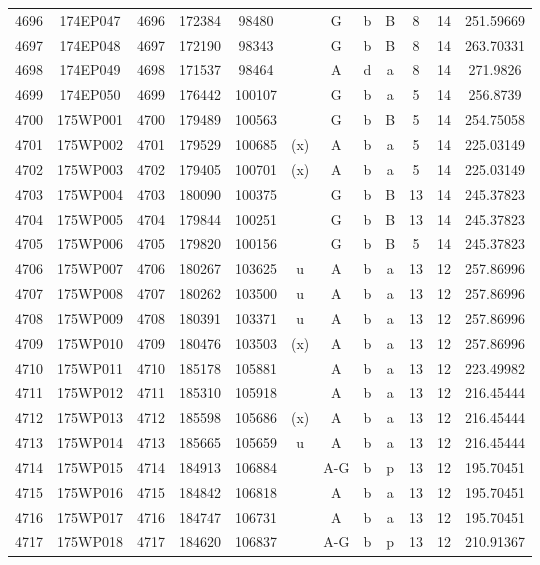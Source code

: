 \begin{tabular}{|*{12}{c|}}
4696 & 174EP047 & 4696 & 172384 & 98480 &  & G & b & B & 8 & 14 & 251.59669 \\ 
4697 & 174EP048 & 4697 & 172190 & 98343 &  & G & b & B & 8 & 14 & 263.70331 \\ 
4698 & 174EP049 & 4698 & 171537 & 98464 &  & A & d & a & 8 & 14 & 271.9826 \\ 
4699 & 174EP050 & 4699 & 176442 & 100107 &  & G & b & a & 5 & 14 & 256.8739 \\ 
4700 & 175WP001 & 4700 & 179489 & 100563 &  & G & b & B & 5 & 14 & 254.75058 \\ 
4701 & 175WP002 & 4701 & 179529 & 100685 & (x) & A & b & a & 5 & 14 & 225.03149 \\ 
4702 & 175WP003 & 4702 & 179405 & 100701 & (x) & A & b & a & 5 & 14 & 225.03149 \\ 
4703 & 175WP004 & 4703 & 180090 & 100375 &  & G & b & B & 13 & 14 & 245.37823 \\ 
4704 & 175WP005 & 4704 & 179844 & 100251 &  & G & b & B & 13 & 14 & 245.37823 \\ 
4705 & 175WP006 & 4705 & 179820 & 100156 &  & G & b & B & 5 & 14 & 245.37823 \\ 
4706 & 175WP007 & 4706 & 180267 & 103625 & u & A & b & a & 13 & 12 & 257.86996 \\ 
4707 & 175WP008 & 4707 & 180262 & 103500 & u & A & b & a & 13 & 12 & 257.86996 \\ 
4708 & 175WP009 & 4708 & 180391 & 103371 & u & A & b & a & 13 & 12 & 257.86996 \\ 
4709 & 175WP010 & 4709 & 180476 & 103503 & (x) & A & b & a & 13 & 12 & 257.86996 \\ 
4710 & 175WP011 & 4710 & 185178 & 105881 &  & A & b & a & 13 & 12 & 223.49982 \\ 
4711 & 175WP012 & 4711 & 185310 & 105918 &  & A & b & a & 13 & 12 & 216.45444 \\ 
4712 & 175WP013 & 4712 & 185598 & 105686 & (x) & A & b & a & 13 & 12 & 216.45444 \\ 
4713 & 175WP014 & 4713 & 185665 & 105659 & u & A & b & a & 13 & 12 & 216.45444 \\ 
4714 & 175WP015 & 4714 & 184913 & 106884 &  & A-G & b & p & 13 & 12 & 195.70451 \\ 
4715 & 175WP016 & 4715 & 184842 & 106818 &  & A & b & a & 13 & 12 & 195.70451 \\ 
4716 & 175WP017 & 4716 & 184747 & 106731 &  & A & b & a & 13 & 12 & 195.70451 \\ 
4717 & 175WP018 & 4717 & 184620 & 106837 &  & A-G & b & p & 13 & 12 & 210.91367 \\ 

\end{tabular}
